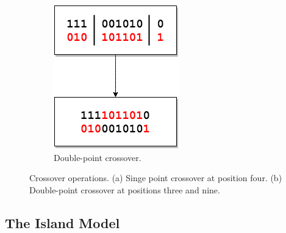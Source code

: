 \documentclass{article}
\begin{document}
\begin{figure}[h!]
\begin{subfigure}[b]{0.3\textwidth}
        \includegraphics[width=\textwidth]{"Double Point Crossover"}
        \caption{Double-point crossover.}
        \label{fig:tiger}
    \end{subfigure}
    \caption{Crossover operations. (a) Singe point crossover at position four. (b) Double-point crossover at positions three and nine.}\label{fig:animals}
\end{figure}


\subsection{The Island Model}
\end{document}
